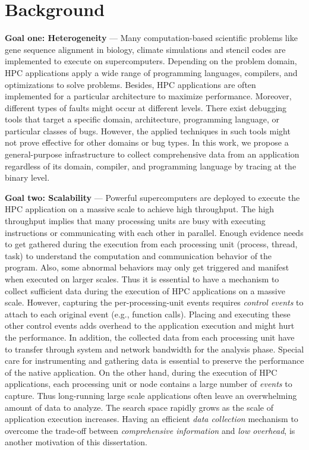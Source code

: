 \section{Background}
\par{ \textbf{Goal one: Heterogeneity} ---
Many computation-based scientific problems like gene sequence alignment in biology, climate simulations and stencil codes are implemented to execute on supercomputers.
%
Depending on the problem domain, HPC applications apply a wide range of programming languages, compilers, and optimizations to solve problems.
%
Besides, HPC applications are often implemented for a particular architecture to maximize performance.
%
Moreover, different types of faults might occur at different levels.
%
There exist debugging tools that target a specific domain, architecture, programming language, or particular classes of bugs.
%
However, the applied techniques in such tools might not prove effective for other domains or bug types.
%
In this work, we propose a general-purpose infrastructure to collect comprehensive data from an application regardless of its domain, compiler, and programming language by tracing at the binary level.
%
}
\par{ \textbf{Goal two: Scalability} ---
Powerful supercomputers are deployed to execute the HPC application on a massive scale to achieve high throughput.
%
The high throughput implies that many processing units are busy with executing instructions or communicating with each other in parallel.
%
Enough evidence needs to get gathered during the execution from each processing unit (process, thread, task) to understand the computation and communication behavior of the program.
%
Also, some abnormal behaviors may only get triggered and manifest when executed on larger scales.
%
Thus it is essential to have a mechanism to collect sufficient data during the execution of HPC applications on a massive scale.
%
However, capturing the per-processing-unit events requires \textit{control events} to attach to each original event (e.g., function calls).
%
Placing and executing these other control events adds overhead to the application execution and might hurt the performance.
%
In addition, the collected data from each processing unit have to transfer through system and network bandwidth for the analysis phase.
%
Special care for instrumenting and gathering data is essential to preserve the performance of the native application.
%
On the other hand, during the execution of HPC applications, each processing unit or node contains a large number of \textit{events} to capture.
%
Thus long-running large scale applications often leave an overwhelming amount of data to analyze.
%
The search space rapidly grows as the scale of application execution increases.
%
Having an efficient \textit{data collection} mechanism to overcome the trade-off between \textit{comprehensive information} and \textit{low overhead}, is another motivation of this dissertation.
%
}
